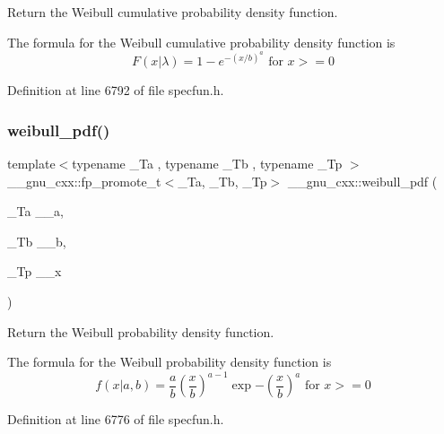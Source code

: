 Return the Weibull cumulative probability density function. 

The formula for the Weibull cumulative probability density function is \[ F(x|\lambda) = 1 - e^{-(x / b)^a} \mbox{ for } x >= 0 \] 

Definition at line 6792 of file specfun.\+h.

\mbox{\label{group__gnu__math__spec__func_gacfbb6ca9df8e0aa092ff4406baff597c}} 
\subsubsection{\texorpdfstring{weibull\+\_\+pdf()}{weibull\_pdf()}}
{\footnotesize\ttfamily template$<$typename \+\_\+\+Ta , typename \+\_\+\+Tb , typename \+\_\+\+Tp $>$ \\
\+\_\+\+\_\+gnu\+\_\+cxx\+::fp\+\_\+promote\+\_\+t$<$\+\_\+\+Ta, \+\_\+\+Tb, \+\_\+\+Tp$>$ \+\_\+\+\_\+gnu\+\_\+cxx\+::weibull\+\_\+pdf (\begin{DoxyParamCaption}\item[{\+\_\+\+Ta}]{\+\_\+\+\_\+a,  }\item[{\+\_\+\+Tb}]{\+\_\+\+\_\+b,  }\item[{\+\_\+\+Tp}]{\+\_\+\+\_\+x }\end{DoxyParamCaption})\hspace{0.3cm}{\ttfamily [inline]}}



Return the Weibull probability density function. 

The formula for the Weibull probability density function is \[ f(x | a, b) = \frac{a}{b} \left(\frac{x}{b} \right)^{a-1} \exp{-\left(\frac{x}{b}\right)^a} \mbox{ for } x >= 0 \] 

Definition at line 6776 of file specfun.\+h.

\mbox{\label{group__gnu__math__spec__func_gaaed33f29c1eb1d2c5b9590fe2e57151c}} 
